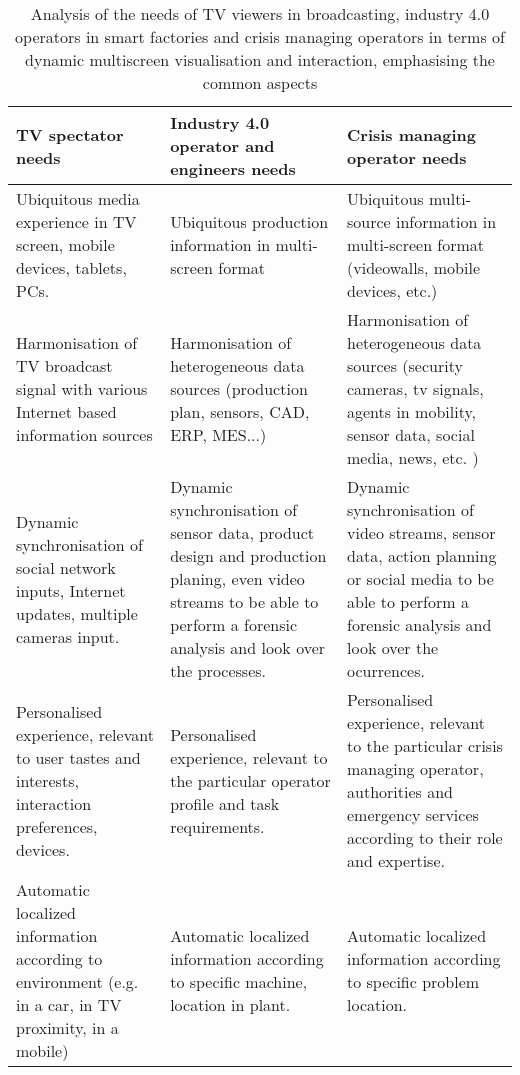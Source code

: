 \begin{table}
	\centering
	\caption{Analysis of the needs of TV viewers in broadcasting, industry 4.0 operators in smart factories and crisis managing operators in terms of dynamic multiscreen visualisation and interaction, emphasising the common aspects}
	\label{tab:comparison}
	\begin{tabular}{||m{4.5cm}|m{4.5cm}|m{4.5cm}||}
		\hline
		\textbf{TV spectator needs} & \textbf{Industry 4.0 operator and engineers needs} & \textbf{Crisis managing operator needs} \\
		\hline
		Ubiquitous media experience in TV screen, mobile devices, tablets, PCs. & Ubiquitous production information in multi-screen format & Ubiquitous multi-source information in multi-screen format (videowalls, mobile devices, etc.)\\
		\hline
		Harmonisation of TV broadcast signal with various Internet based information sources & Harmonisation of heterogeneous data sources (production plan, sensors, CAD, ERP, MES...) & Harmonisation of heterogeneous data sources (security cameras, tv signals, agents in mobility, sensor data, social media, news, etc. )\\
		\hline
		Dynamic synchronisation of social network inputs, Internet updates, multiple cameras input. & Dynamic synchronisation of sensor data, product design and production planing, even video streams to be able to perform a forensic analysis and look over the processes. & Dynamic synchronisation of video streams, sensor data, action planning or social media to be able to perform a forensic analysis and look over the ocurrences. \\
		\hline
		Personalised experience, relevant to user tastes and interests, interaction preferences, devices.& Personalised experience, relevant to the particular operator profile and task requirements. & Personalised experience, relevant to the particular crisis managing operator, authorities and emergency services according to their role and expertise. \\
		\hline
		Automatic localized information according to environment (e.g. in a car, in TV proximity, in a mobile) & Automatic localized information according to specific machine, location in plant.& Automatic localized information according to specific problem location. \\
		\hline
	\end{tabular}
\end{table}


